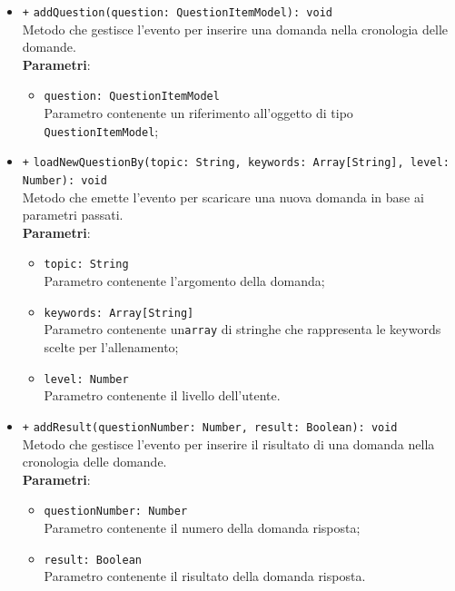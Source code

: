 \begin{itemize}
		\begin{itemize}
			\item \texttt{+} \texttt{addQuestion(question: QuestionItemModel): void} \\
			Metodo che gestisce l'evento per inserire una domanda nella cronologia delle domande. \\
			\textbf{Parametri}:
			\begin{itemize}
				\item \texttt{question: QuestionItemModel} \\
				Parametro contenente un riferimento all'oggetto di tipo \texttt{QuestionItemModel};
			\end{itemize}
			\item \texttt{+} \texttt{loadNewQuestionBy(topic: String, keywords: Array[String], level: Number): void} \\
			Metodo che emette l'evento per scaricare una nuova domanda in base ai parametri passati. \\
			\textbf{Parametri}:
			\begin{itemize}
				\item \texttt{topic: String} \\
				Parametro contenente l'argomento della domanda;
				\item \texttt{keywords: Array[String]} \\
				Parametro contenente un\texttt{array} di stringhe che rappresenta le keywords scelte per l'allenamento;
				\item \texttt{level: Number} \\
				Parametro contenente il livello dell'utente.
			\end{itemize}
			\item \texttt{+} \texttt{addResult(questionNumber: Number, result: Boolean): void} \\
			Metodo che gestisce l'evento per inserire il risultato di una domanda nella cronologia delle domande. \\
			\textbf{Parametri}:
			\begin{itemize}
				\item \texttt{questionNumber: Number} \\
				Parametro contenente il numero della domanda risposta;
				\item \texttt{result: Boolean} \\
				Parametro contenente il risultato della domanda risposta.
			\end{itemize}
		\end{itemize}
	\end{itemize}
	
	
